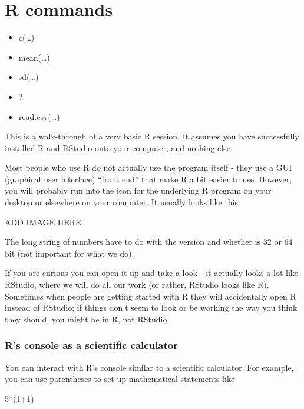 \documentclass[
]{book}
\newenvironment{Shaded}{\begin{snugshade}}{\end{snugshade}}
\newcommand{\DecValTok}[1]{\textcolor[rgb]{0.00,0.00,0.81}{#1}}
\newcommand{\NormalTok}[1]{#1}
\newcommand{\SpecialCharTok}[1]{\textcolor[rgb]{0.00,0.00,0.00}{#1}}
\providecommand{\tightlist}{%
  \setlength{\itemsep}{0pt}\setlength{\parskip}{0pt}}
\begin{document}
\hypertarget{r-commands}{%
\section*{R commands}\label{r-commands}}

\begin{itemize}
\tightlist
\item
  c(\ldots)
\item
  mean(\ldots)
\item
  sd(\ldots)
\item
  ?
\item
  read.csv(\ldots)
\end{itemize}

This is a walk-through of a very basic R session. It assumes you have successfully installed R and RStudio onto your computer, and nothing else.

Most people who use R do not actually use the program itself - they use a GUI (graphical user interface) ``front end'' that make R a bit easier to use. However, you will probably run into the icon for the underlying R program on your desktop or elsewhere on your computer. It usually looks like this:

ADD IMAGE HERE

The long string of numbers have to do with the version and whether is 32 or 64 bit (not important for what we do).

If you are curious you can open it up and take a look - it actually looks a lot like RStudio, where we will do all our work (or rather, RStudio looks like R). Sometimes when people are getting started with R they will accidentally open R instead of RStudio; if things don't seem to look or be working the way you think they should, you might be in R, not RStudio

\hypertarget{rs-console-as-a-scientific-calculator}{%
\subsubsection{R's console as a scientific calculator}\label{rs-console-as-a-scientific-calculator}}

You can interact with R's console similar to a scientific calculator. For example, you can use parentheses to set up mathematical statements like

\begin{Shaded}
\begin{Highlighting}[]
\DecValTok{5}\SpecialCharTok{*}\NormalTok{(}\DecValTok{1}\SpecialCharTok{+}\DecValTok{1}\NormalTok{)}
\end{Highlighting}
\end{Shaded}
\end{document}
